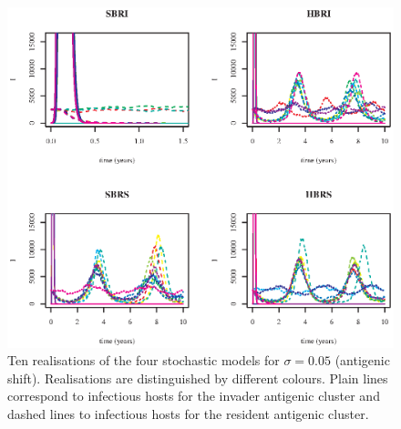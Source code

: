 \begin{figure}[!h]
  \center
	\includegraphics[width=0.8\linewidth]{graphs/article1/traj_sto_shift_theo.eps}
	\caption{Ten realisations of the four stochastic
          models for $\sigma = 0.05$ (antigenic shift). Realisations
          are distinguished by different colours. Plain lines
          correspond to infectious hosts for the invader antigenic
          cluster and dashed lines to infectious hosts for the
          resident antigenic cluster.}
	\label{fig:sto_shift}
\end{figure}


